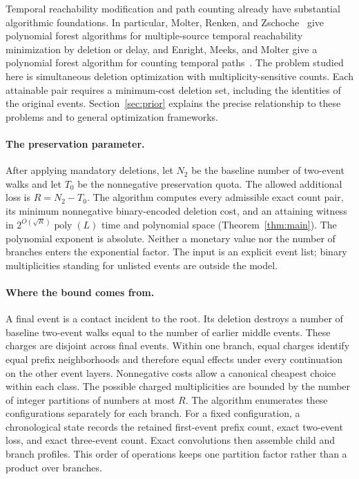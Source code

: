 \documentclass[11pt]{article}
\theoremstyle{remark}
\newcommand{\poly}{\operatorname{poly}}
\begin{document}
Temporal reachability modification and path counting already have substantial
algorithmic foundations. In particular, Molter, Renken, and
Zschoche~\citep[Theorems 14--15]{molter2024} give polynomial forest
algorithms for multiple-source temporal reachability minimization by deletion
or delay, and Enright, Meeks, and Molter give a polynomial forest algorithm
for counting temporal paths~\citep{enright2025counting}.
The problem studied here is simultaneous deletion optimization with
multiplicity-sensitive counts. Each attainable pair requires a minimum-cost deletion set,
including the identities of the original events. Section~\ref{sec:prior}
explains the precise relationship to these problems and to general
optimization frameworks.

\paragraph{The preservation parameter.}
After applying mandatory deletions, let $N_2$ be the baseline number of
two-event walks and let $T_0$ be the nonnegative preservation quota. The allowed
additional loss is $R=N_2-T_0$. The algorithm computes every admissible exact
count pair, its minimum nonnegative binary-encoded deletion cost, and an
attaining witness in $2^{O(\sqrt R)}\poly(L)$ time and polynomial space
(Theorem~\ref{thm:main}). The polynomial exponent is absolute. Neither a
monetary value nor the number of branches enters the exponential factor.
The input is an explicit event list; binary multiplicities standing for
unlisted events are outside the model.

\paragraph{Where the bound comes from.}
A final event is a contact incident to the root. Its deletion destroys a
number of baseline two-event walks equal to the number of earlier middle
events. These charges are disjoint across final events. Within one branch,
equal charges identify equal prefix neighborhoods and therefore equal effects
under every continuation on the other event layers. Nonnegative costs allow a
canonical cheapest choice within each class. The possible charged
multiplicities are bounded by the number of integer partitions of numbers at
most $R$. The algorithm enumerates these configurations separately for each branch.
For a fixed configuration, a chronological state records the retained
first-event prefix count, exact two-event loss, and exact three-event count.
Exact convolutions then assemble child and branch profiles. This order of
operations keeps one partition factor rather than a product over branches.
\end{document}

